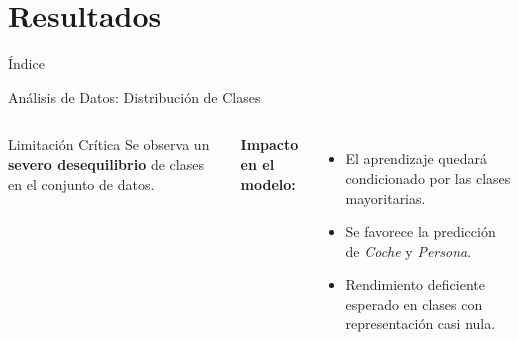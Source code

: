 \documentclass[aspectratio=169]{beamer}
\begin{document}
	\section{Resultados}
	\begin{frame}{Índice}
		\tableofcontents[currentsection] 
	\end{frame}
	\begin{frame}{Análisis de Datos: Distribución de Clases}
		\begin{columns}
			\begin{alertblock}{Limitación Crítica}
				Se observa un \textbf{severo desequilibrio} de clases en el conjunto de datos.
			\end{alertblock}
			
			\vspace{0.1cm}
			\textbf{Impacto en el modelo:}
			\begin{itemize}
				\item El aprendizaje quedará condicionado por las clases mayoritarias.
				\item Se favorece la predicción de \textit{Coche} y \textit{Persona}.
				\item Rendimiento deficiente esperado en clases con representación casi nula.
			\end{itemize}
			

\end{columns}
\end{frame}
\end{document}
